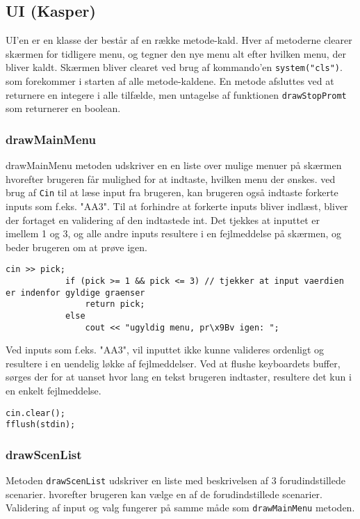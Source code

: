 \subsection{UI (Kasper)}

UI'en er en klasse der består af en række metode-kald. Hver af metoderne clearer skærmen for tidligere menu, og tegner den nye menu alt efter hvilken menu, der bliver kaldt. Skærmen bliver clearet ved brug af kommando'en \texttt{system("cls")}. som forekommer i starten af alle metode-kaldene. En metode afsluttes ved at returnere en integere i alle tilfælde, men untagelse af funktionen \texttt{drawStopPromt} som returnerer en boolean.

\subsubsection{drawMainMenu}
drawMainMenu metoden udskriver en en liste over mulige menuer på skærmen hvorefter brugeren får mulighed for at indtaste, hvilken menu der ønskes. ved brug af \texttt{Cin} til at læse input fra brugeren, kan brugeren også indtaste forkerte inputs som f.eks. "AA3". Til at forhindre at forkerte inputs bliver indlæst, bliver der fortaget en validering af den indtastede int. Det tjekkes at inputtet er imellem 1 og 3, og alle andre inputs resultere i en fejlmeddelse på skærmen, og beder brugeren om at prøve igen.
\begin{lstlisting}
cin >> pick;
			if (pick >= 1 && pick <= 3) // tjekker at input vaerdien er indenfor gyldige graenser
				return pick;
			else
				cout << "ugyldig menu, pr\x9Bv igen: ";
\end{lstlisting}


Ved inputs som f.eks. "AA3", vil inputtet ikke kunne valideres ordenligt og resultere i en uendelig løkke af fejlmeddelser. Ved at flushe keyboardets buffer, sørges der for at uanset hvor lang en tekst brugeren indtaster, resultere det kun i en enkelt fejlmeddelse.
\begin{lstlisting}
cin.clear();
fflush(stdin);
\end{lstlisting}

\subsubsection{drawScenList}
Metoden \texttt{drawScenList} udskriver en liste med beskrivelsen af 3 forudindstillede scenarier. hvorefter brugeren kan vælge en af de forudindstillede scenarier. Validering af input og valg fungerer på samme måde som \texttt{drawMainMenu} metoden.

